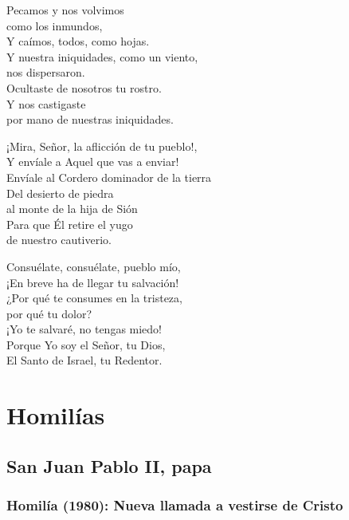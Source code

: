 \begin{patercite}
	Pecamos y nos volvimos \\como los inmundos, \\Y caímos, todos, como hojas. \\Y nuestra iniquidades, como un viento, \\nos dispersaron. \\Ocultaste de nosotros tu rostro. \\Y nos castigaste \\por mano de nuestras iniquidades.
	
	¡Mira, Señor, la aflicción de tu pueblo!, \\Y envíale a Aquel que vas a enviar! \\Envíale al Cordero dominador de la tierra \\Del desierto de piedra \\al monte de la hija de Sión \\Para que Él retire el yugo \\de nuestro cautiverio.
	
	Consuélate, consuélate, pueblo mío, \\¡En breve ha de llegar tu salvación! \\¿Por qué te consumes en la tristeza, \\por qué tu dolor? \\¡Yo te salvaré, no tengas miedo! \\Porque Yo soy el Señor, tu Dios, \\El Santo de Israel, tu Redentor.\strut
\end{patercite}

\newsection

\section{Homilías}

\subsection{San Juan Pablo II, papa}

\subsubsection{Homilía (1980): Nueva llamada a vestirse de Cristo}

